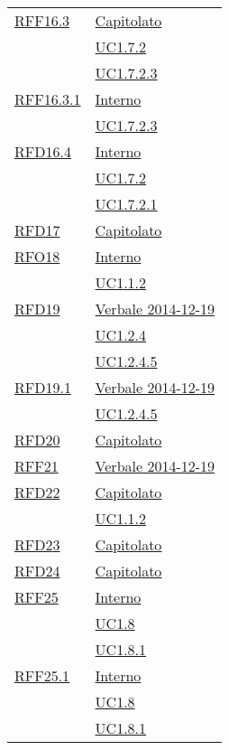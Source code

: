 \begin{longtable}{|>{\centering}m{5cm}|m{5cm}<{\centering}|}
\hyperlink{RFF16.3}{RFF16.3} & \hyperlink{Capitolato}{Capitolato}\\
& \hyperref[UC1.7.2]{UC1.7.2}\\
& \hyperref[UC1.7.2.3]{UC1.7.2.3}\\ \hline
\hyperlink{RFF16.3.1}{RFF16.3.1} & \hyperlink{Interno}{Interno}\\
& \hyperref[UC1.7.2.3]{UC1.7.2.3}\\ \hline
\hyperlink{RFD16.4}{RFD16.4} & \hyperlink{Interno}{Interno}\\
& \hyperref[UC1.7.2]{UC1.7.2}\\
& \hyperref[UC1.7.2.1]{UC1.7.2.1}\\ \hline
\hyperlink{RFD17}{RFD17} & \hyperlink{Capitolato}{Capitolato}\\ \hline
\hyperlink{RFO18}{RFO18} & \hyperlink{Interno}{Interno}\\
& \hyperref[UC1.1.2]{UC1.1.2}\\ \hline
\hyperlink{RFD19}{RFD19} & \hyperlink{Verbale 2014-12-19}{Verbale 2014-12-19}\\
& \hyperref[UC1.2.4]{UC1.2.4}\\
& \hyperref[UC1.2.4.5]{UC1.2.4.5}\\ \hline
\hyperlink{RFD19.1}{RFD19.1} & \hyperlink{Verbale 2014-12-19}{Verbale 2014-12-19}\\
& \hyperref[UC1.2.4.5]{UC1.2.4.5}\\ \hline
\hyperlink{RFD20}{RFD20} & \hyperlink{Capitolato}{Capitolato}\\ \hline
\hyperlink{RFF21}{RFF21} & \hyperlink{Verbale 2014-12-19}{Verbale 2014-12-19}\\ \hline
\hyperlink{RFD22}{RFD22} & \hyperlink{Capitolato}{Capitolato}\\
& \hyperref[UC1.1.2]{UC1.1.2}\\ \hline
\hyperlink{RFD23}{RFD23} & \hyperlink{Capitolato}{Capitolato}\\ \hline
\hyperlink{RFD24}{RFD24} & \hyperlink{Capitolato}{Capitolato}\\ \hline
\hyperlink{RFF25}{RFF25} & \hyperlink{Interno}{Interno}\\
& \hyperref[UC1.8]{UC1.8}\\
& \hyperref[UC1.8.1]{UC1.8.1}\\ \hline
\hyperlink{RFF25.1}{RFF25.1} & \hyperlink{Interno}{Interno}\\
& \hyperref[UC1.8]{UC1.8}\\
& \hyperref[UC1.8.1]{UC1.8.1}\\ \hline

\end{longtable}
